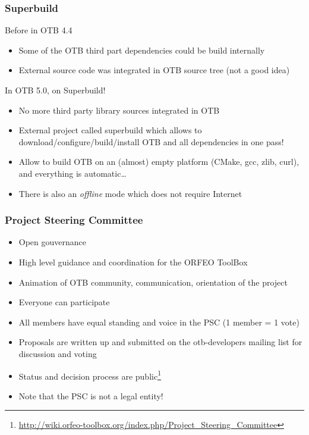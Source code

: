 \documentclass[8pt]{beamer}
\begin{document}
\begin{frame}
\frametitle{Superbuild}
\begin{block}{Before in OTB 4.4}
\begin{itemize}
\item Some of the OTB third part dependencies could be build internally
\item External source code was integrated in OTB source tree (not a good idea)
\end{itemize}
\end{block}

\begin{block}{In OTB 5.0, on Superbuild!}
\begin{itemize}
\item No more third party library sources integrated in OTB
\item External project called superbuild which allows to
  download/configure/build/install OTB and all dependencies in one pass!
\item Allow to build OTB on an (almost) empty platform (CMake, gcc, zlib, curl),
  and everything is automatic\ldots
\item There is also an \textit{offline} mode which does not require Internet
\end{itemize}
\end{block}
\end{frame}

\begin{frame}
\frametitle{Project Steering Committee}
\begin{itemize}
\item Open gouvernance
\item High level guidance and coordination for the ORFEO ToolBox
\item Animation of OTB community, communication, orientation of the project
\item Everyone can participate
\item All members have equal standing and voice in the PSC (1 member = 1 vote)
\item Proposals are written up and submitted on the otb-developers mailing list for discussion and voting
\item Status and decision process are
  public\footnote{\url{http://wiki.orfeo-toolbox.org/index.php/Project_Steering_Committee}}
\item Note that the PSC is not a legal entity!
\end{itemize}
\end{frame}
\end{document}
